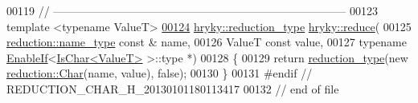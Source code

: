 \begin{DoxyCode}
00119 \textcolor{comment}{//
      ------------------------------------------------------------------------------}
00123 \textcolor{comment}{}\textcolor{keyword}{template} <\textcolor{keyword}{typename} ValueT>
\hypertarget{reduction__char_8h_source_l00124}{}\hyperlink{namespacehryky_a328d36b3d03e02e1a7cae6093bb0a0c8}{00124} \hyperlink{classhryky_1_1_intrusive_ptr}{hryky::reduction_type} \hyperlink{namespacehryky_af41cb3af6766761da0ff21b84527a52c}{hryky::reduce}(
00125     \hyperlink{classhryky_1_1reduction_1_1_string}{reduction::name_type} \textcolor{keyword}{const} & name,
00126     ValueT \textcolor{keyword}{const} value,
00127     \textcolor{keyword}{typename} \hyperlink{classhryky_1_1_enable_if}{EnableIf}<\hyperlink{classhryky_1_1_is_char}{IsChar<ValueT>} >::type *)
00128 \{
00129     \textcolor{keywordflow}{return} \hyperlink{namespacehryky_a343a9a4c36a586be5c2693156200eadc}{reduction_type}(\textcolor{keyword}{new} \hyperlink{classhryky_1_1reduction_1_1_char}{reduction::Char}(name, value), \textcolor{keyword}{false});
00130 \}
00131 \textcolor{preprocessor}{#endif // REDUCTION\_CHAR\_H\_20130101180113417}
00132 \textcolor{preprocessor}{}\textcolor{comment}{// end of file}
\end{DoxyCode}
